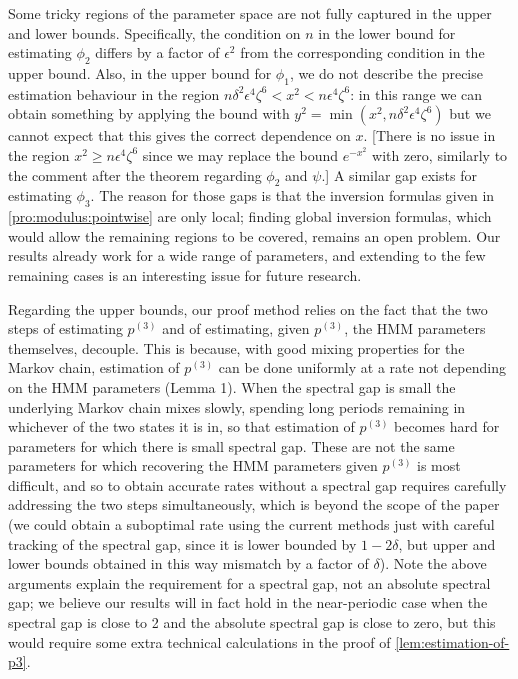 \documentclass[journal]{IEEEtran}
\newcommand{\1}{\boldsymbol{1}}
\begin{document}
	Some tricky regions of the parameter space are not fully captured in the upper and lower bounds. Specifically, the condition on $n$ in the lower bound for estimating $\phi_2$ differs by a factor of $\epsilon^2$ from the corresponding condition in the upper bound.
Also, in the upper bound for $\phi_1$, we do not describe the precise estimation behaviour in the region $n\delta^2\epsilon^4\zeta^6<x^2< n\epsilon^4\zeta^6$: in this range we can obtain something by applying the bound with $y^2=\min(x^2,n\delta^2\epsilon^4\zeta^6)$ but we cannot expect that this gives the correct dependence on $x$. [There is no issue in the region $x^2\geq n\epsilon^4\zeta^6$ since we may replace the bound $e^{-x^2}$ with zero, similarly to the comment after the theorem regarding $\phi_2$ and $\psi$.] A similar gap exists for estimating $\phi_3$.  The reason for those gaps is that the inversion formulas given in \cref{pro:modulus:pointwise} are only local; finding global inversion formulas, which would allow the remaining regions to be covered, remains an open problem. 
Our results already work for a wide range of parameters, and extending to the few remaining cases is an interesting issue for future research.

	Regarding the upper bounds, 
	our proof method relies on the fact that the two steps of estimating $p^{(3)}$ and of estimating, given $p^{(3)}$, the HMM parameters themselves, decouple. This is because, with good mixing properties for the Markov chain, estimation of $p^{(3)}$ can be done uniformly at a rate not depending on the HMM parameters (Lemma 1). When the spectral gap is small the underlying Markov chain mixes slowly, spending long periods remaining in whichever of the two states it is in, so that estimation of $p^{(3)}$ becomes hard for parameters for which there is small spectral gap. These are not the same parameters for which recovering the HMM parameters given $p^{(3)}$ is most difficult, and so to obtain accurate rates without a spectral gap requires carefully addressing the two steps simultaneously, which is beyond the scope of the paper (we could obtain a suboptimal rate using the current methods just with careful tracking of the spectral gap, since it is lower bounded by $1-2\delta$, but upper and lower bounds obtained in this way mismatch by a factor of $\delta$). Note the above arguments explain the requirement for a spectral gap, not an absolute spectral gap; we believe our results will in fact hold in the near-periodic case when the spectral gap is close to 2 and the absolute spectral gap is close to zero, but this would require some extra technical calculations in the proof of \cref{lem:estimation-of-p3}.
\end{document}
